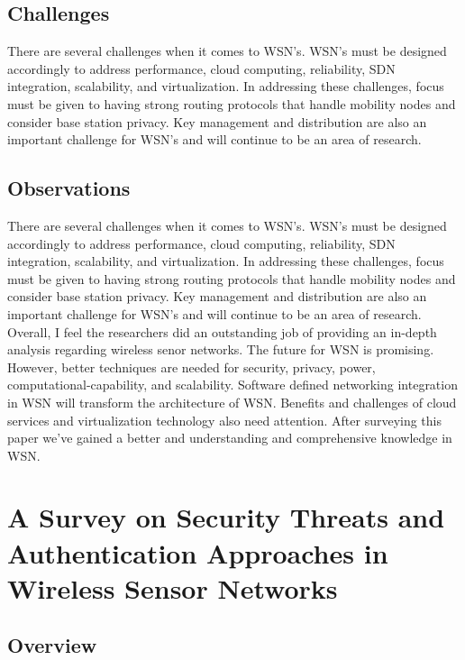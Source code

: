 \subsection {Challenges} 

There are several challenges when it comes to WSN’s. WSN’s must be designed accordingly to address performance, cloud computing, reliability, SDN integration, scalability, and virtualization. In addressing these challenges, focus must be given to having strong routing protocols that handle mobility nodes and consider base station privacy. Key management and distribution are also an important challenge for WSN’s and will continue to be an area of research.

\subsection {Observations}

There are several challenges when it comes to WSN’s. WSN’s must be designed accordingly to address performance, cloud computing, reliability, SDN integration, scalability, and virtualization. In addressing these challenges, focus must be given to having strong routing protocols that handle mobility nodes and consider base station privacy. Key management and distribution are also an important challenge for WSN’s and will continue to be an area of research. Overall, I feel the researchers did an outstanding job of providing an in-depth analysis regarding wireless senor networks. The future for WSN is promising. However, better techniques are needed for security, privacy, power, computational-capability, and scalability. Software defined networking integration in WSN will transform the architecture of WSN. Benefits and challenges of cloud services and virtualization technology also need attention. After surveying this paper we’ve gained a better and understanding and comprehensive knowledge in WSN.


\section {A Survey on Security Threats and Authentication Approaches in Wireless Sensor Networks}
\subsection {Overview}


